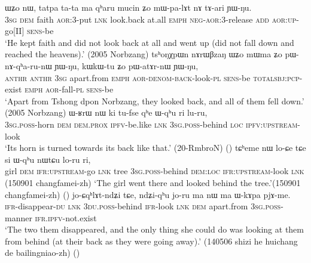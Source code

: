 \begin{exe}
\ex \label{ex:qharu2}
\begin{xlist}[(ii)]
 \label{ex:qharu.mWpalAt}
\gll  ɯʑo nɯ, tatpa ta-ta ma qʰaru mucin ʑo mɯ-pa-lɤt nɤ tɤ-ari ɲɯ-ŋu. \\
\textsc{3sg} \textsc{dem} faith \textsc{aor}:3\flobv{}-put \textsc{lnk} look.back at.all \textsc{emph} \textsc{neg}-\textsc{aor}:3\flobv{}-release \textsc{add} \textsc{aor}:\textsc{up}-go[II] \textsc{sens}-be \\
\glt `He kept faith and did not look back at all and went up (did not fall down and reached the heavens).' (2005 Norbzang)
\gll  tsʰoŋχpɯn nɤrɯβzaŋ ɯʑo mɯma ʑo pɯ-nɤ-qʰa-ru-nɯ ɲɯ-ŋu, kɯ\redp{}kɯ-tu ʑo pɯ-atɤr-nɯ ɲɯ-ŋu, \\
\textsc{anthr}  \textsc{anthr} \textsc{3sg} apart.from \textsc{emph} \textsc{aor}-\textsc{denom}-\textsc{back}-look-\textsc{pl} \textsc{sens}-be \textsc{total}\redp{}\textsc{sbj}:\textsc{pcp}-exist \textsc{emph} \textsc{aor}-fall-\textsc{pl} \textsc{sens}-be \\
\glt `Apart from Tshong dpon Norbzang, they looked back, and all of them fell down.' (2005 Norbzang)
 \label{ex:Wqhu.luru}
\gll ɯ-ʁrɯ nɯ ki tu-fse qʰe  ɯ-qʰu ri lu-ru,  \\
\textsc{3sg}.\textsc{poss}-horn \textsc{dem} \textsc{dem}.\textsc{prox} \textsc{ipfv}-be.like \textsc{lnk} \textsc{3sg}.\textsc{poss}-behind \textsc{loc} \textsc{ipfv}:\textsc{upstream}-look \\
\glt `Its horn is turned towards its back like that.' (20-RmbroN) 
()
 \label{ex:si.Wqhu.loru}
\gll tɕʰeme nɯ lo-ɕe tɕe si ɯ-qʰu nɯtɕu lo-ru ri, \\
girl \textsc{dem} \textsc{ifr}:\textsc{upstream}-go \textsc{lnk} tree \textsc{3sg}.\textsc{poss}-behind \textsc{dem}:\textsc{loc} \textsc{ifr}:\textsc{upstream}-look \textsc{lnk} \\
\glt (150901 changfamei-zh)
\glt `The girl went there and looked behind the tree.'(150901 changfamei-zh)
()
 \label{ex:ndZiqhu.koru}
\gll jo-ɕqʰlɤt-ndʑi tɕe, ndʑi-qʰu jo-ru ma nɯ ma ɯ-kɤpa pjɤ-me. \\
\textsc{ifr}-disappear-\textsc{du} \textsc{lnk} \textsc{3du}.\textsc{poss}-behind \textsc{ifr}-look \textsc{lnk} \textsc{dem} apart.from \textsc{3sg}.\textsc{poss}-manner \textsc{ifr}.\textsc{ipfv}-not.exist \\
\glt `The two them disappeared, and the only thing she could do was looking at them from behind (at their back as they were going away).' (140506 shizi he huichang de bailingniao-zh)
()
\end{xlist}
\end{exe}

